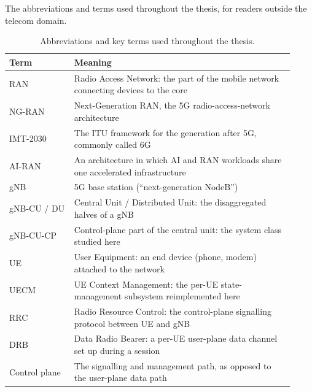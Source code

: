 \documentclass[english,oneside,a4paper,censored,csm,software-track-2020]{HYthesisML}
\renewcommand{\arraystretch}{0.95}
\begin{document}
\backmatter
\begin{appendices}

The abbreviations and terms used throughout the thesis, for readers outside the telecom domain.

\begin{table}[H]
\centering
\caption[Abbreviations and key terms]{Abbreviations and key terms used throughout the thesis.\label{tab:abbrev}}
\singlespacing
\footnotesize
\renewcommand{\arraystretch}{1.2}
\begin{tabular}{@{}p{0.21\linewidth} p{0.71\linewidth}@{}}
\hline\hline
Term & Meaning \\
\hline
RAN & Radio Access Network: the part of the mobile network connecting devices to the core \\
NG-RAN & Next-Generation RAN, the 5G radio-access-network architecture \\
IMT-2030 & The ITU framework for the generation after 5G, commonly called 6G \\
AI-RAN & An architecture in which AI and RAN workloads share one accelerated infrastructure \\
gNB & 5G base station (``next-generation NodeB'') \\
gNB-CU / DU & Central Unit / Distributed Unit: the disaggregated halves of a gNB \\
gNB-CU-CP & Control-plane part of the central unit: the system class studied here \\
UE & User Equipment: an end device (phone, modem) attached to the network \\
UECM & UE Context Management: the per-UE state-management subsystem reimplemented here \\
RRC & Radio Resource Control: the control-plane signalling protocol between UE and gNB \\
DRB & Data Radio Bearer: a per-UE user-plane data channel set up during a session \\
Control plane & The signalling and management path, as opposed to the user-plane data path \\

\end{tabular}
\end{table}
\end{appendices}
\end{document}
